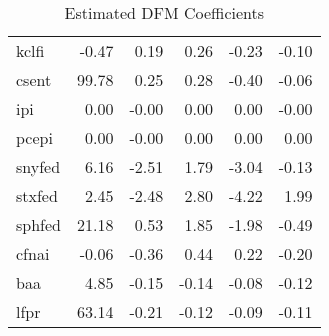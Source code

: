 \documentclass[11pt, letterpaper]{article}\usepackage[]{graphicx}\usepackage[]{color}
\begin{document}
\begin{table}[H]
\begin{tabular}{lrrrrr}
  kclfi & -0.47 & 0.19 & 0.26 & -0.23 & -0.10 \\ 
  csent & 99.78 & 0.25 & 0.28 & -0.40 & -0.06 \\ 
  ipi & 0.00 & -0.00 & 0.00 & 0.00 & -0.00 \\ 
  pcepi & 0.00 & -0.00 & 0.00 & 0.00 & 0.00 \\ 
  snyfed & 6.16 & -2.51 & 1.79 & -3.04 & -0.13 \\ 
  stxfed & 2.45 & -2.48 & 2.80 & -4.22 & 1.99 \\ 
  sphfed & 21.18 & 0.53 & 1.85 & -1.98 & -0.49 \\ 
  cfnai & -0.06 & -0.36 & 0.44 & 0.22 & -0.20 \\ 
  baa & 4.85 & -0.15 & -0.14 & -0.08 & -0.12 \\ 
  lfpr & 63.14 & -0.21 & -0.12 & -0.09 & -0.11 \\ 
   \hline
\end{tabular}
\endgroup
\caption{Estimated DFM Coefficients} 
\end{table}
\end{document}
